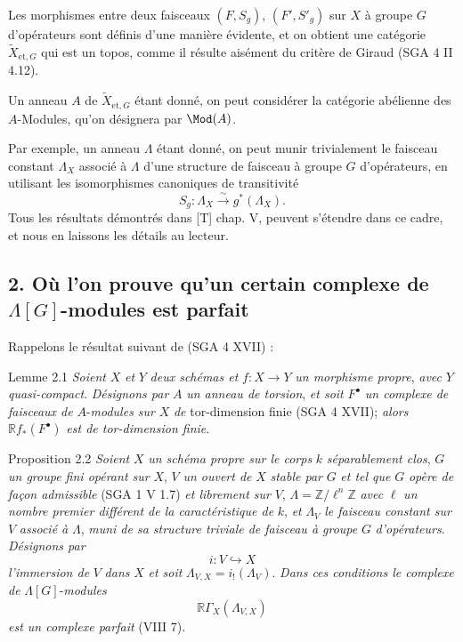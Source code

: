 Les morphismes entre deux faisceaux $(F,S_g)$, $(F',S'_g)$ sur $X$ à groupe $G$ d'opérateurs sont définis d'une manière évidente, et on obtient une catégorie $\widetilde X_{\mathrm{et},G}$ qui est un topos, comme il résulte aisément du critère de Giraud (SGA 4 II 4.12).

Un anneau $A$ de $\widetilde X_{\mathrm{et},G}$ étant donné, on peut considérer la catégorie abélienne des $A$-Modules, qu'on désignera par $\Mod(A)$.

Par exemple, un anneau $\Lambda$ étant donné, on peut munir trivialement le faisceau constant $\Lambda_X$ associé à $\Lambda$ d'une structure de faisceau à groupe $G$ d'opérateurs, en utilisant les isomorphismes canoniques de transitivité
\[
S_g:\Lambda_X\xrightarrow{\sim}g^*(\Lambda_X).
\]
Tous les résultats démontrés dans [T] chap. V, peuvent s'étendre dans ce cadre, et nous en laissons les détails au lecteur.

\subsection*{2. Où l'on prouve qu'un certain complexe de $\Lambda[G]$-modules est parfait}

Rappelons le résultat suivant de (SGA 4 XVII) :

\begin{statement}{Lemme 2.1}
\emph{Soient} $X$ \emph{et} $Y$ \emph{deux schémas et} $f:X\to Y$ \emph{un morphisme propre}, \emph{avec} $Y$ \emph{quasi-compact}. \emph{Désignons par} $A$ \emph{un anneau de torsion}, \emph{et soit} $F^\bullet$ \emph{un complexe de faisceaux de} $A$-\emph{modules sur} $X$ \emph{de} tor-dimension finie (SGA 4 XVII); \emph{alors} $\mathbb{R} f_*(F^\bullet)$ \emph{est de tor-dimension finie}.
\end{statement}

\begin{statement}{Proposition 2.2}
\emph{Soient} $X$ \emph{un schéma propre sur le corps} $k$ \emph{séparablement clos}, $G$ \emph{un groupe fini opérant sur} $X$, $V$ \emph{un ouvert de} $X$ \emph{stable par} $G$ \emph{et tel que} $G$ \emph{opère de façon admissible} (SGA 1 V 1.7) \emph{et librement sur} $V$, $\Lambda=\mathbb{Z}/\ell^n\mathbb{Z}$ \emph{avec} $\ell$ \emph{un nombre premier différent de la caractéristique de} $k$, \emph{et} $\Lambda_V$ \emph{le faisceau constant sur} $V$ \emph{associé à} $\Lambda$, \emph{muni de sa structure triviale de faisceau à groupe} $G$ \emph{d'opérateurs}. \emph{Désignons par}
\[
i:V\hookrightarrow X
\]
\emph{l'immersion de} $V$ \emph{dans} $X$ \emph{et soit} $\Lambda_{V,X}=i_!(\Lambda_V)$. \emph{Dans ces conditions le complexe de} $\Lambda[G]$-\emph{modules}
\[
\mathbb{R}\Gamma_X(\Lambda_{V,X})
\]
\emph{est un complexe parfait} (VIII 7).
\end{statement}

